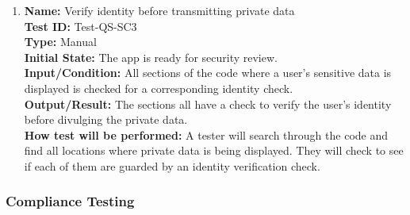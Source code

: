 \documentclass[12pt, titlepage]{article}
\begin{document}
\begin{enumerate}
    \item
    \textbf{Name:} Verify identity before transmitting private data \label{itm:Test-QS-SC3} \\
    \textbf{Test ID:} Test-QS-SC3 \\
    \textbf{Type:} Manual \\
    \textbf{Initial State:} The app is ready for security review. \\
    \textbf{Input/Condition:} All sections of the code where a user's sensitive data is displayed is checked for a corresponding identity check. \\
    \textbf{Output/Result:} The sections all have a check to verify the user's identity before divulging the private data. \\
    \textbf{How test will be performed:} A tester will search through the code and find all locations where private data is being displayed. They will check to see if each of them are guarded by an identity verification check.

\end{enumerate}

\subsubsection{Compliance Testing}
\end{document}

